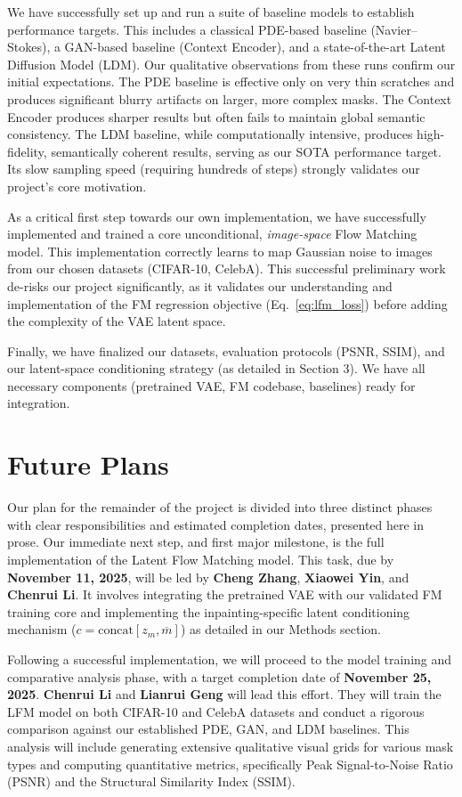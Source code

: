 \documentclass{article}
\begin{document}
We have successfully set up and run a suite of baseline models to establish performance targets. This includes a classical PDE-based baseline (Navier–Stokes), a GAN-based baseline (Context Encoder), and a state-of-the-art Latent Diffusion Model (LDM). Our qualitative observations from these runs confirm our initial expectations. The PDE baseline is effective only on very thin scratches and produces significant blurry artifacts on larger, more complex masks. The Context Encoder produces sharper results but often fails to maintain global semantic consistency. The LDM baseline, while computationally intensive, produces high-fidelity, semantically coherent results, serving as our SOTA performance target. Its slow sampling speed (requiring hundreds of steps) strongly validates our project's core motivation.

As a critical first step towards our own implementation, we have successfully implemented and trained a core unconditional, \emph{image-space} Flow Matching model. This implementation correctly learns to map Gaussian noise to images from our chosen datasets (CIFAR-10, CelebA). This successful preliminary work de-risks our project significantly, as it validates our understanding and implementation of the FM regression objective (Eq.~\ref{eq:lfm_loss}) before adding the complexity of the VAE latent space.

Finally, we have finalized our datasets, evaluation protocols (PSNR, SSIM), and our latent-space conditioning strategy (as detailed in Section 3). We have all necessary components (pretrained VAE, FM codebase, baselines) ready for integration.

\section{Future Plans}

Our plan for the remainder of the project is divided into three distinct phases with clear responsibilities and estimated completion dates, presented here in prose. Our immediate next step, and first major milestone, is the full implementation of the Latent Flow Matching model. This task, due by \textbf{November 11, 2025}, will be led by \textbf{Cheng Zhang}, \textbf{Xiaowei Yin}, and \textbf{Chenrui Li}. It involves integrating the pretrained VAE with our validated FM training core and implementing the inpainting-specific latent conditioning mechanism ($c = \text{concat}[z_m, \overline{m}]$) as detailed in our Methods section.

Following a successful implementation, we will proceed to the model training and comparative analysis phase, with a target completion date of \textbf{November 25, 2025}. \textbf{Chenrui Li} and \textbf{Lianrui Geng} will lead this effort. They will train the LFM model on both CIFAR-10 and CelebA datasets and conduct a rigorous comparison against our established PDE, GAN, and LDM baselines. This analysis will include generating extensive qualitative visual grids for various mask types and computing quantitative metrics, specifically Peak Signal-to-Noise Ratio (PSNR) and the Structural Similarity Index (SSIM).
\end{document}
